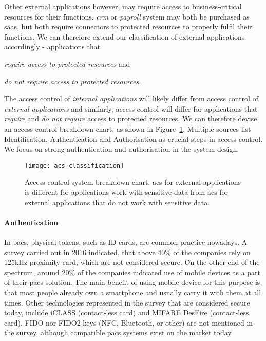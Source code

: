 Other external applications however, may require access to business-critical resources for their functions. \textit{\acrlong{crm}} or \textit{payroll} system may both be purchased as \acrshort{saas}, but both require connectors to protected resources to properly fulfil their functions. We can therefore extend our classification of external applications accordingly - applications that
\begin{enumerate*}[label=(\roman*)]
    \item \textit{require access to protected resources} and
    \item \textit{do not require access to protected resources}.
\end{enumerate*}

The access control of \textit{internal applications} will likely differ from access control of \textit{external applications} and similarly, access control will differ for applications that \textit{require} and \textit{do not require} access to protected resources. We can therefore devise an access control breakdown chart, as shown in Figure~\ref{fig:acs-classification}. Multiple sources list Identification, Authentication and Authorisation as crucial steps in access control. 
We focus on strong authentication and authorisation in the system design. 

\begin{figure}[ht]
    \centering
    \texttt{[image: acs-classification]}
    \caption{Access control system breakdown chart. \acrshort{acs} for external applications is different for applications work with sensitive data from \acrshort{acs} for external applications that do not work with sensitive data.}
    \label{fig:acs-classification}
\end{figure}

\paragraph{Authentication}
In \acrshort{pacs}, physical tokens, such as ID cards, are common practice nowadays. A survey carried out in 2016 indicated, that above 40\% of the companies rely on 125kHz proximity card, which are not considered secure. On the other end of the spectrum, around 20\% of the companies indicated use of mobile devices as a part of their \acrshort{pacs} solution. 
The main benefit of using mobile device for this purpose is, that most people already own a smartphone and usually carry it with them at all times. Other technologies represented in the survey that are considered secure today, include iCLASS (contact-less card) and MIFARE DesFire (contact-less card). FIDO nor FIDO2 keys (NFC, Bluetooth, or other) are not mentioned in the survey, although compatible \acrshort{pacs} systems exist on the market today\footnotemark.
% 

